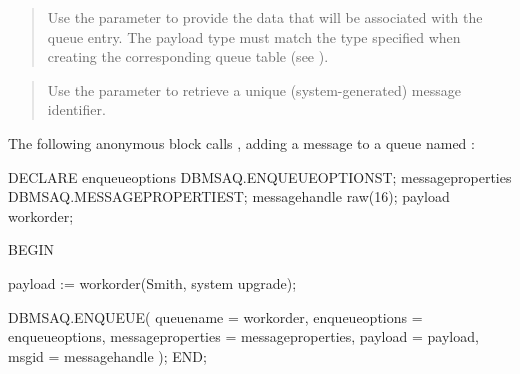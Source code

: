 \documentclass[letterpaper,10pt,english,openany,oneside]{sphinxmanual}
\begin{document}
\begin{quote}

Use the  parameter to provide the data that will be
associated with the queue entry. The payload type must match the
type specified when creating the corresponding queue table (see
).
\end{quote}

\begin{quote}

Use the  parameter to retrieve a unique (system-generated)
message identifier.
\end{quote}


The following anonymous block calls , adding a message
to a queue named :

%
\begin{sphinxVerbatim}[commandchars=\\\{\}]
DECLARE
 enqueue\PYGZus{}options    DBMS\PYGZus{}AQ.ENQUEUE\PYGZus{}OPTIONS\PYGZus{}T;
 message\PYGZus{}properties DBMS\PYGZus{}AQ.MESSAGE\PYGZus{}PROPERTIES\PYGZus{}T;
 message\PYGZus{}handle     raw(16);
 payload            work\PYGZus{}order;

BEGIN

 payload := work\PYGZus{}order(\PYGZsq{}Smith\PYGZsq{}, \PYGZsq{}system upgrade\PYGZsq{});

DBMS\PYGZus{}AQ.ENQUEUE(
 queue\PYGZus{}name         =\PYGZgt{} \PYGZsq{}work\PYGZus{}order\PYGZsq{},
 enqueue\PYGZus{}options    =\PYGZgt{} enqueue\PYGZus{}options,
 message\PYGZus{}properties =\PYGZgt{} message\PYGZus{}properties,
 payload            =\PYGZgt{} payload,
 msgid              =\PYGZgt{} message\PYGZus{}handle
   );
END;
\end{sphinxVerbatim}

\newpage
\end{document}
